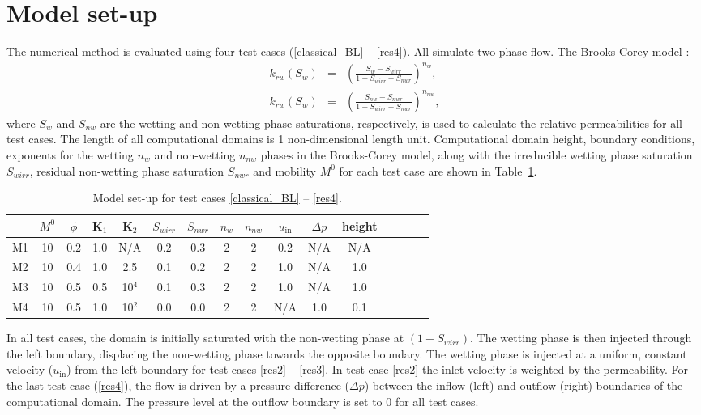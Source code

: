 \documentclass[preprint,authoryear,12pt]{elsarticle}
\begin{document}
\section{Model set-up}\label{setup}
The numerical method is evaluated using four test cases (\ref{classical_BL} --
\ref{res4}). All simulate two-phase flow. The Brooks-Corey model
\citep{brooks_1964}: 
\begin{eqnarray}
k_{rw}\left ( S_{w} \right ) &=& \left ( \frac{S_w-S_{wirr}}{1-S_{wirr}-S_{nwr}} \right )^{n_w}, \\
k_{rw}\left ( S_{w} \right ) &=& \left ( \frac{S_{nw}-S_{nwr}}{1-S_{wirr}-S_{nwr}} \right)^{n_{nw}}, 
\end{eqnarray}
where $S_w$ and $S_{nw}$ are the wetting and non-wetting phase
saturations, respectively, is used to calculate the relative
permeabilities for all test cases. The length of all computational
domains is 1 non-dimensional length unit. Computational domain height,
boundary conditions, exponents for the wetting $n_w$ and non-wetting
$n_{nw}$ phases in the Brooks-Corey model, along with the irreducible
wetting phase saturation $S_{wirr}$, residual non-wetting phase
saturation $S_{nwr}$ and mobility $M^0$ for each test case are shown
in Table~\ref{tab:1}.

\begin{table}[h!]
  \centering
  \small{
    \caption{Model set-up for test cases \ref{classical_BL} --
      \ref{res4}.\label{tab:1}}
    \begin{tabular}{c c c c c c c c c c c c c c c c } 
      \hline
      & $M^0$ & $\phi$ & $\mathbf{K}_\text{1}$ & $\mathbf{K}_\text{2}$ & $S_{wirr}$ & $S_{nwr}$ & $n_{w}$ & $n_{nw}$ & $u_{\mathrm{in}}$ & $\Delta p$ & height \\ \hline
      M1 & 10 & 0.2 & 1.0 & N/A    & 0.2 & 0.3 & 2 & 2 & 0.2 & N/A & N/A\\ 
      M2 & 10 & 0.4 & 1.0 & 2.5    & 0.1 & 0.2 & 2 & 2 & 1.0 & N/A & 1.0\\ 
      M3 & 10 & 0.5 & 0.5 & 10$^4$ & 0.1 & 0.3 & 2 & 2 & 1.0 & N/A & 1.0\\ 
      M4 & 10 & 0.5 & 1.0 & 10$^2$ & 0.0 & 0.0 & 2 & 2 & N/A & 1.0 & 0.1\\ \hline
    \end{tabular}
  }
\end{table}

In all test cases, the domain is initially saturated with the
non-wetting phase at $(1- S_{wirr}).$ The wetting phase is then
injected through the left boundary, displacing the non-wetting phase
towards the opposite boundary. The wetting phase is injected at a
uniform, constant velocity ($u_{\mathrm{in}}$) from the left boundary
for test cases \ref{res2} -- \ref{res3}. In test case \ref{res2} the
inlet velocity is weighted by the permeability. For the last test case
(\ref{res4}), the flow is driven by a pressure difference ($\Delta p$)
between the inflow (left) and outflow (right) boundaries of the
computational domain. The pressure level at the outflow boundary is
set to 0 for all test cases.
\end{document}
